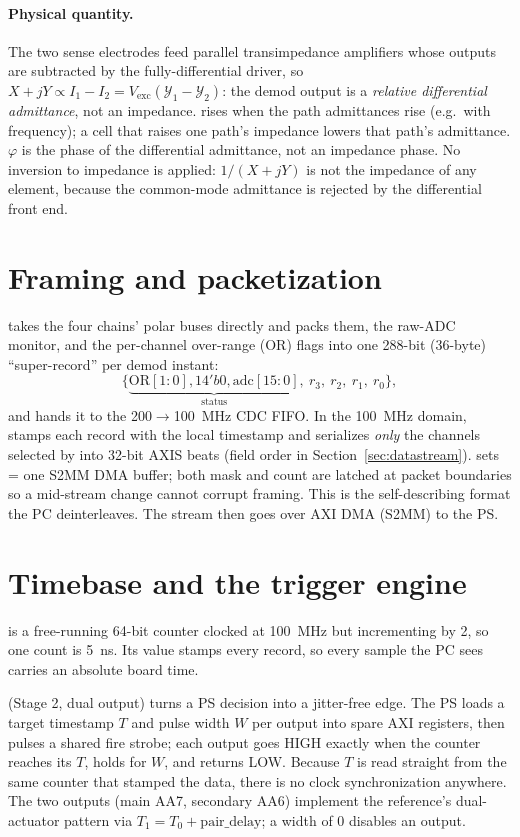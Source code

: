 \paragraph{Physical quantity.} The two sense electrodes feed parallel
transimpedance amplifiers whose outputs are subtracted by the fully-differential
driver, so $X + jY \propto I_1 - I_2 = V_\text{exc}(\mathcal{Y}_1 - \mathcal{Y}_2)$:
the demod output is a \emph{relative differential admittance}, not an impedance.
 rises when the path admittances rise (e.g.\ with frequency); a cell
that raises one path's impedance lowers that path's admittance. $\varphi$ is the
phase of the differential admittance, not an impedance phase. No inversion to
impedance is applied: $1/(X+jY)$ is not the impedance of any element, because the
common-mode admittance is rejected by the differential front end.

\section{Framing and packetization}
 takes the four chains' polar buses directly and
packs them, the raw-ADC monitor, and the per-channel over-range (OR) flags into
one 288-bit (36-byte) ``super-record'' per demod instant:
\[
\{\underbrace{\text{OR}[1:0], 14'b0, \text{adc}[15:0]}_{\text{status}},\ r_3,\ r_2,\ r_1,\ r_0\},
\]
and hands it to the \SI{200}{}$\to$\SI{100}{\mega\hertz} CDC FIFO. In the
\SI{100}{\mega\hertz} domain,  stamps each record
with the local timestamp and serializes \emph{only} the channels selected by
 into 32-bit AXIS beats (field order in
Section~\ref{sec:datastream}).  sets  =
one S2MM DMA buffer; both mask and count are latched at packet boundaries so a
mid-stream change cannot corrupt framing. This is the self-describing format the
PC deinterleaves. The stream then goes over AXI DMA (S2MM) to the PS.

\section{Timebase and the trigger engine}
 is a free-running 64-bit counter clocked at
\SI{100}{\mega\hertz} but incrementing by 2, so one count is \SI{5}{\nano\second}.
Its value stamps every record, so every sample the PC sees carries an absolute
board time.

 (Stage 2, dual output) turns a PS decision into a
jitter-free edge. The PS loads a target timestamp $T$ and pulse width $W$ per
output into spare AXI registers, then pulses a shared fire strobe; each output
goes HIGH exactly when the counter reaches its $T$, holds for $W$, and returns
LOW. Because $T$ is read straight from the same counter that stamped the data,
there is no clock synchronization anywhere. The two outputs (main AA7,
secondary AA6) implement the reference's dual-actuator pattern via
$T_1 = T_0 + \text{pair\_delay}$; a width of 0 disables an output.

